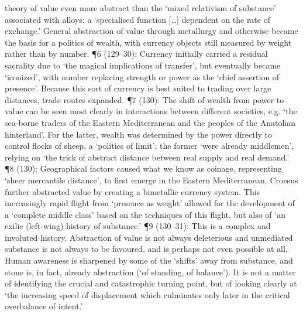 \documentclass[]{article}
\begin{document}
theory of value even more abstract than the `mixed relativism of
substance' associated with alloys: a `specialised function
{[}\ldots{}{]} dependent on the rate of exchange.' General abstraction
of value through metallurgy and otherwise became the basis for a
politics of wealth, with currency objects still measured by weight
rather than by number. ¶6 (129--30): Currency initially carried a
residual sacrality due to `the magical implications of transfer', but
eventually became `iconized', with number replacing strength or power as
the `chief assertion of presence'. Because this sort of currency is best
suited to trading over large distances, trade routes expanded. ¶7 (130):
The shift of wealth from power to value can be seen most clearly in
interactions between different societies, e.g. `the sea-borne traders of
the Eastern Mediterranean and the peoples of the Anatolian hinterland'.
For the latter, wealth was determined by the power directly to control
flocks of sheep, a `politics of limit'; the former `were already
middlemen', relying on `the trick of abstract distance between real
supply and real demand.' ¶8 (130): Geographical factors caused what we
know as coinage, representing `sheer mercantile distance', to first
emerge in the Eastern Mediterranean. Croesus further abstracted value by
creating a bimetallic currency system. This increasingly rapid flight
from `presence as weight' allowed for the development of a `complete
middle class' based on the techniques of this flight, but also of `an
exilic (left-wing) history of substance.' ¶9 (130--31): This is a
complex and involuted history. Abstraction of value is not always
deleterious and unmediated substance is not always to be favoured, and
is perhaps not even possible at all. Human awareness is sharpened by
some of the `shifts' away from substance, and stone is, in fact, already
abstraction (`of standing, of balance'). It is not a matter of
identifying the crucial and catastrophic turning point, but of looking
clearly at `the increasing speed of displacement which culminates only
later in the critical overbalance of intent.'
\end{document}
